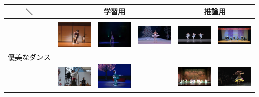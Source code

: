 \begin{table}[t]
  \begin{center}
    \begin{tabular}{|c|ccc|cc|} \hline
      ＼ & \multicolumn{3}{|c|}{学習用} & \multicolumn{2}{|c|}{推論用} \\ \hline
        &&&&& \\
        & \includegraphics[width=17mm]{images/snaps/japanese_elegant.png}
        & \includegraphics[width=17mm]{images/snaps/chinese_elegant.png}
        & \includegraphics[width=17mm]{images/snaps/ballet_elegant.png}
        & \includegraphics[width=17mm]{images/snaps/ballet_group_elegant.png}
        & \includegraphics[width=17mm]{images/snaps/japanese_group_elegant.png}
      \\
      優美なダンス & \cite{jpn} & \cite{china} & \cite{ballet} & \cite{balletgroup} & \cite{jpngroup}
      \\
        & \includegraphics[width=17mm]{images/snaps/thai_elegant.png}
        & \includegraphics[width=17mm]{images/snaps/japanese2_elegant.png}
        &
        & \includegraphics[width=17mm]{images/snaps/chinese_group_elegant.png}
        & \includegraphics[width=17mm]{images/snaps/belly_elegant.png}

\end{tabular}
\end{center}
\end{table}

